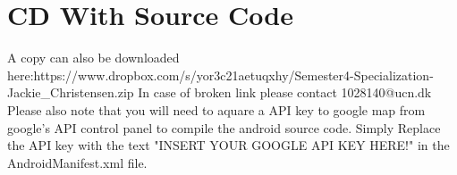 \chapter*{CD With Source Code}

A copy can also be downloaded here:\newline https://www.dropbox.com/s/yor3c21aetuqxhy/Semester4-\linebreak Specialization-Jackie\_Christensen.zip
\newline
\newline
In case of broken link please contact 1028140@ucn.dk
\newline
\newline
\newline
Please also note that you will need to aquare a API key to google map from google's API control panel to compile the android source code. Simply Replace the API key with the text "INSERT YOUR GOOGLE API KEY HERE!" in the AndroidManifest.xml file.